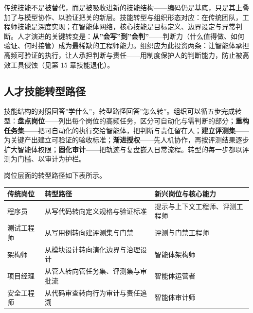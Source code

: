 \documentclass[12pt,a4paper,twoside,openany]{ctexbook}
\numberwithin{figure}{chapter}
\numberwithin{table}{chapter}
\newcounter{none}
\begin{document}
传统技能不是被替代，而是被吸收进新的技能结构------编码仍是基底，只是其上叠加了与模型协作、以验证把关的新层。技能转型与组织形态对应：在传统团队，工程师技能是深度实现；在智能体网络，核心技能是目标定义、边界设定与异常判断。人才演进的关键转变是：\textbf{从''会写''到''会判''}------判断力（什么值得做、如何验证、何时接管）成为最稀缺的工程师能力。组织应为此投资两条：让智能体承担高频可验证的执行，让人承担判断与责任------用制度保护人的判断能力，防止被高效工具侵蚀（见第
15 章技能退化）。

\subsection{人才技能转型路径}\label{ux4ebaux624dux6280ux80fdux8f6cux578bux8defux5f84}

技能结构的对照回答''学什么''，转型路径回答''怎么转''。组织可以循五步完成转型：\textbf{盘点岗位}------列出每个岗位的高频任务，区分可自动化与需判断的部分；\textbf{重构任务集}------把可自动化的执行交给智能体，把判断与责任留在人；\textbf{建立评测集}------为关键产出建立可验证的验收标准；\textbf{渐进授权}------先人机协作，再按评测结果逐步扩大智能体权限；\textbf{固化审计}------把轨迹与复盘嵌入日常流程。转型的每一步都以评测为门槛、以审计为护栏。

岗位层面的转型路径如下表所示。

{\def\LTcaptype{none} %
\begin{longtable}[]{@{}
  >{\raggedright\arraybackslash}p{}
  >{\raggedright\arraybackslash}p{}
  >{\raggedright\arraybackslash}p{}@{}}
\toprule\noalign{}
\begin{minipage}[b]{\linewidth}\raggedright
传统岗位
\end{minipage} & \begin{minipage}[b]{\linewidth}\raggedright
转型路径
\end{minipage} & \begin{minipage}[b]{\linewidth}\raggedright
新兴岗位与核心能力
\end{minipage} \\
\midrule\noalign{}
\endhead
\bottomrule\noalign{}
\endlastfoot
程序员 & 从写代码转向定义规格与验证标准 &
提示与上下文工程师、评测工程师 \\
测试工程师 & 从写用例转向建评测集与门禁 & 评测与门禁工程师 \\
架构师 & 从模块设计转向演化边界与治理设计 & 智能体架构师 \\
项目经理 & 从管人转向管任务集、评测集与审批流 & 智能体运营者 \\
安全工程师 & 从代码审查转向行为审计与责任追溯 & 智能体审计师 \\
\end{longtable}
}
\end{document}
